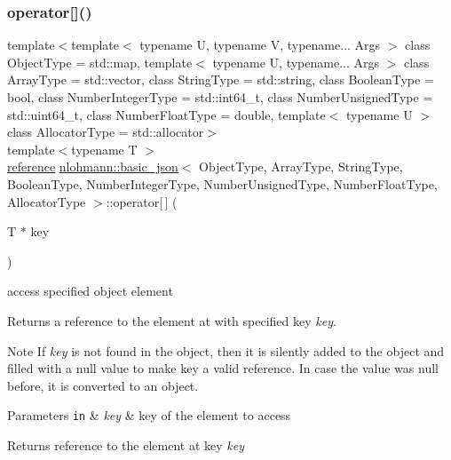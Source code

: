 \subsubsection{\texorpdfstring{operator[]()}{operator[]()}\hspace{0.1cm}{\footnotesize\ttfamily [7/10]}}
{\footnotesize\ttfamily template$<$template$<$ typename U, typename V, typename... Args $>$ class Object\+Type = std\+::map, template$<$ typename U, typename... Args $>$ class Array\+Type = std\+::vector, class String\+Type  = std\+::string, class Boolean\+Type  = bool, class Number\+Integer\+Type  = std\+::int64\+\_\+t, class Number\+Unsigned\+Type  = std\+::uint64\+\_\+t, class Number\+Float\+Type  = double, template$<$ typename U $>$ class Allocator\+Type = std\+::allocator$>$ \\
template$<$typename T $>$ \\
\hyperlink{classnlohmann_1_1basic__json_a3ec8e17be8732fe436e9d6733f52b7a3}{reference} \hyperlink{classnlohmann_1_1basic__json}{nlohmann\+::basic\+\_\+json}$<$ Object\+Type, Array\+Type, String\+Type, Boolean\+Type, Number\+Integer\+Type, Number\+Unsigned\+Type, Number\+Float\+Type, Allocator\+Type $>$\+::operator\mbox{[}$\,$\mbox{]} (\begin{DoxyParamCaption}\item[{T $\ast$}]{key }\end{DoxyParamCaption})\hspace{0.3cm}{\ttfamily [inline]}}



access specified object element 

Returns a reference to the element at with specified key {\itshape key}.

\begin{DoxyNote}{Note}
If {\itshape key} is not found in the object, then it is silently added to the object and filled with a {\ttfamily null} value to make {\ttfamily key} a valid reference. In case the value was {\ttfamily null} before, it is converted to an object.
\end{DoxyNote}

\begin{DoxyParams}[1]{Parameters}
\mbox{\tt in}  & {\em key} & key of the element to access\\
\hline
\end{DoxyParams}
\begin{DoxyReturn}{Returns}
reference to the element at key {\itshape key} 
\end{DoxyReturn}

